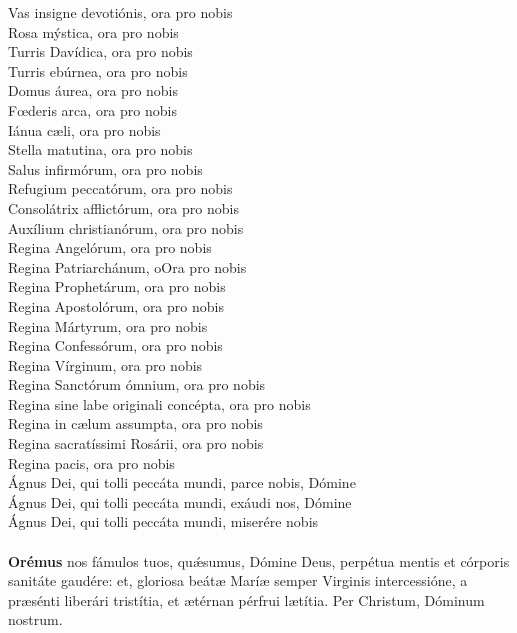 Vas insigne devotiónis, ora pro nobis\\
Rosa mýstica, ora pro nobis\\
Turris Davídica, ora pro nobis\\
Turris ebúrnea, ora pro nobis\\
Domus áurea, ora pro nobis\\
F{\oe}deris arca, ora pro nobis\\
Iánua c{\ae}li, ora pro nobis\\
Stella matutina, ora pro nobis\\
Salus infirmórum, ora pro nobis\\
Refugium peccatórum, ora pro nobis\\
Consolátrix afflictórum, ora pro nobis\\
Auxílium christianórum, ora pro nobis\\
Regina Angelórum, ora pro nobis\\
Regina Patriarchánum, oOra pro nobis\\
Regina Prophetárum, ora pro nobis\\
Regina Apostolórum, ora pro nobis\\
Regina Mártyrum, ora pro nobis\\
Regina Confessórum, ora pro nobis\\
Regina Vírginum, ora pro nobis\\
Regina Sanctórum ómnium, ora pro nobis\\
Regina sine labe originali concépta, ora pro nobis\\
Regina in c{\ae}lum assumpta, ora pro nobis\\
Regina sacratíssimi Rosárii, ora pro nobis\\
Regina pacis, ora pro nobis\\
Ágnus Dei, qui tolli peccáta mundi, parce nobis, Dómine\\
Ágnus Dei, qui tolli peccáta mundi, exáudi nos, Dómine\\
Ágnus Dei, qui tolli peccáta mundi, miserére nobis\\
\orapronobissalve\\

\textbf{Orémus}
nos fámulos tuos, qu{\'\ae}sumus, Dómine Deus, perpétua mentis et córporis sanitáte gaudére: et, gloriosa beát{\ae}
Marí{\ae} semper Virginis intercessióne, a pr{\ae}sénti liberári tristítia, et {\ae}térnan pérfrui l{\ae}títia. Per Christum, Dóminum nostrum.

